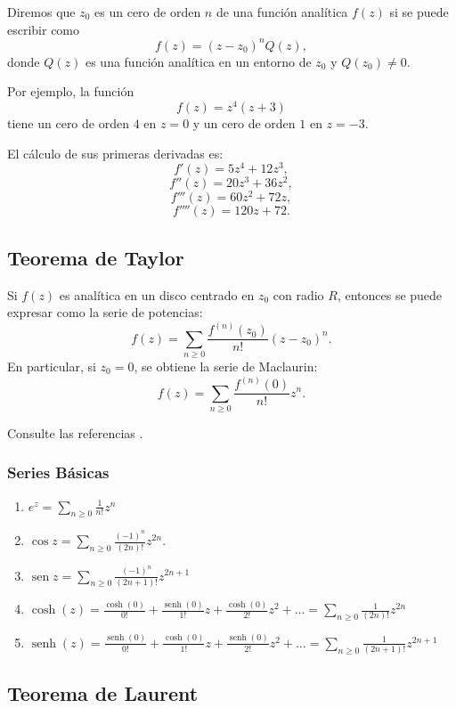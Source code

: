 \documentclass[a4paper,12pt]{article}
\begin{document}
Diremos que $z_0$ es un cero de orden $n$ de una función analítica $f(z)$ si se puede escribir como
\[
f(z) = (z - z_0)^n Q(z),
\]
donde $Q(z)$ es una función analítica en un entorno de $z_0$ y $Q(z_0) \neq 0$.  

Por ejemplo, la función
\[
f(z) = z^4 (z+3)
\]
tiene un cero de orden $4$ en $z = 0$ y un cero de orden $1$ en $z = -3$.  

El cálculo de sus primeras derivadas es:
\[
f'(z) = 5z^4 + 12z^3,
\]
\[
f''(z) = 20z^3 + 36z^2,
\]
\[
f'''(z) = 60z^2 + 72z,
\]
\[
f''''(z) = 120z + 72.
\]


\subsection{Teorema de Taylor}
Si $f(z)$ es analítica en un disco centrado en $z_0$ con radio $R$, entonces se puede expresar como la serie de potencias:
\begin{equation*}
    f(z) = \sum_{n \geq 0} \frac{f^{(n)}(z_0)}{n!} (z - z_0)^n.
\end{equation*}
En particular, si $z_0 = 0$, se obtiene la serie de Maclaurin:
\begin{equation*}
    f(z) = \sum_{n \geq 0} \frac{f^{(n)}(0)}{n!} z^n.
\end{equation*}

Consulte las referencias \cite{Fuster1989} \cite{Wylie1969}.

\subsubsection{Series Básicas}
\begin{enumerate}
  \item $e^{z}=\sum_{n \geq 0} \frac{1}{n!} z^{n}$
  \item $\cos z=\sum_{n \geq 0} \frac{(-1)^{n}}{(2 n)!} z^{2 n}$.
  \item $\operatorname{sen} z=\sum_{n \geq 0} \frac{(-1)^{n}}{(2 n+1)!} z^{2 n+1}$
  \item $\cosh (z)=\frac{\cosh (0)}{0!}+\frac{\operatorname{senh}(0)}{1!} z+\frac{\cosh (0)}{2!} z^{2}+\ldots=\sum_{n \geq 0} \frac{1}{(2 n)!} z^{2 n}$
  \item $\operatorname{senh}(z)=\frac{\operatorname{senh}(0)}{0!}+\frac{\cosh (0)}{1!} z+\frac{\operatorname{senh}(0)}{2!} z^{2}+\ldots=\sum_{n \geq 0} \frac{1}{(2 n+1)!} z^{2 n+1}$
\end{enumerate}

\subsection{Teorema de Laurent}
\end{document}
